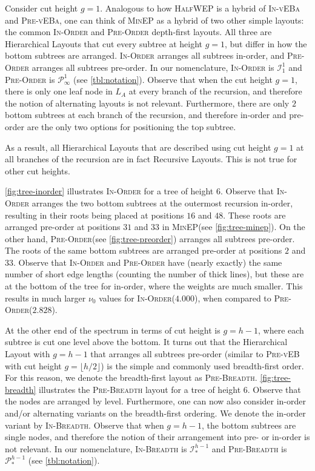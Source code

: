 \documentclass[10pt,conference,letterpaper]{IEEEtran}
\newcommand{\comment}[1]{}
\newcommand{\node}{node\xspace}
\newcommand{\nodes}{nodes\xspace}
\newcommand{\HL}{Hierarchical Layout\xspace}
\newcommand{\HLs}{Hierarchical Layouts\xspace}
\newcommand{\RLs}{Recursive Layouts\xspace}
\newcommand{\pvl}{\textsc{Pre-vEB}\xspace}
\newcommand{\pvla}{\textsc{Pre-vEBa}\xspace}
\newcommand{\ivla}{\textsc{In-vEBa}\xspace}
\newcommand{\preorder}{\textsc{Pre-Order}\xspace}
\newcommand{\inorder}{\textsc{In-Order}\xspace}
\newcommand{\prebreadth}{\textsc{Pre-Breadth}\xspace}
\newcommand{\inbreadth}{\textsc{In-Breadth}\xspace}
\newcommand{\PR}{\ensuremath{\mathcal{P}}\xspace}
\newcommand{\IN}{\ensuremath{\mathcal{I}}\xspace}
\newcommand{\FLOOR}[1]{\ensuremath{\lfloor #1 \rfloor}\xspace}
\newcommand{\pwmean}[1][p]{\ensuremath{\nu_{#1}}\xspace}
\newcommand{\minep}{\textsc{MinEP}\xspace}
\newcommand{\halfwep}{\textsc{HalfWEP}\xspace}
\begin{document}
Consider cut height $g=1$. Analogous to how \halfwep is a hybrid of \ivla and \pvla, one can think of \minep as a hybrid of two other simple layouts: the common \inorder and \preorder depth-first layouts. All three are \HLs that cut every subtree at height $g=1$, but differ in how the bottom subtrees are arranged. \inorder arranges all subtrees in-order, and \preorder arranges all subtrees pre-order. In our nomenclature, \inorder is $\IN^{1}_1$ and \preorder is $\PR^1_\infty$ (see \autoref{tbl:notation}).
Observe that when the cut height $g=1$, there is only one leaf \node in $L_A$ at every branch of the recursion, and therefore the notion of alternating layouts is not relevant. Furthermore, there are only $2$ bottom subtrees at each branch of the recursion, and therefore in-order and pre-order are the only two options for positioning the top subtree. 
\comment{Due to this restriction, }
As a result, all \HLs that are described using cut height $g=1$ at all branches of the recursion are in fact \RLs. This is not true for other cut heights.

\autoref{fig:tree-inorder} illustrates \inorder for a tree of height $6$. Observe that \inorder arranges the two bottom subtrees at the outermost recursion in-order, resulting in their roots being placed at positions $16$ and $48$. These roots are arranged pre-order at positions $31$ and $33$ in \minep (see \autoref{fig:tree-minep}). On the other hand, \preorder (see \autoref{fig:tree-preorder}) arranges all subtrees pre-order. The roots of the same bottom subtrees are arranged pre-order at positions $2$ and $33$. 
Observe that \inorder and \preorder have (nearly exactly) the same number of short edge lengths (counting the number of thick lines), but these are at the bottom of the tree for in-order, where the weights are much smaller. This results in much larger \pwmean[0] values for \inorder ($4.000$), when compared to \preorder ($2.828$).

At the other end of the spectrum in terms of cut height is $g=h-1$, where each subtree is cut one level above the bottom. 
It turns out that the \HL with $g=h-1$ that arranges all subtrees pre-order (similar to \pvl with cut height $g=\FLOOR{h/2}$) is the simple and commonly used breadth-first order. For this reason, we denote the breadth-first layout as \prebreadth. \autoref{fig:tree-breadth} illustrates the \prebreadth layout for a tree of height $6$. Observe that the \nodes are arranged by level. Furthermore, one can now also consider in-order and/or alternating variants on the breadth-first ordering. We denote the in-order variant by \inbreadth. Observe that when $g=h-1$, the bottom subtrees are single \nodes, and therefore the notion of their arrangement into pre- or in-order is not relevant. In our nomenclature, 
\inbreadth is $\IN^{h-1}_*$ and \prebreadth is $\PR^{h-1}_{*}$ (see \autoref{tbl:notation}).
\end{document}
